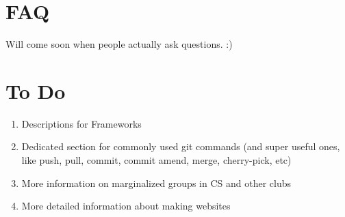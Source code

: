 \documentclass{article}
\begin{document}
\section {FAQ}
Will come soon when people actually ask questions. :) 
\begin{enumerate}
\end{enumerate}
\newpage
\section{To Do}
\begin{enumerate}
\item Descriptions for Frameworks 
\item Dedicated section for commonly used git commands (and super useful ones, like push, pull, commit, commit amend, merge, cherry-pick, etc)
\item More information on marginalized groups in CS and other clubs
\item More detailed information about making websites
\end{enumerate}
\end{document}

